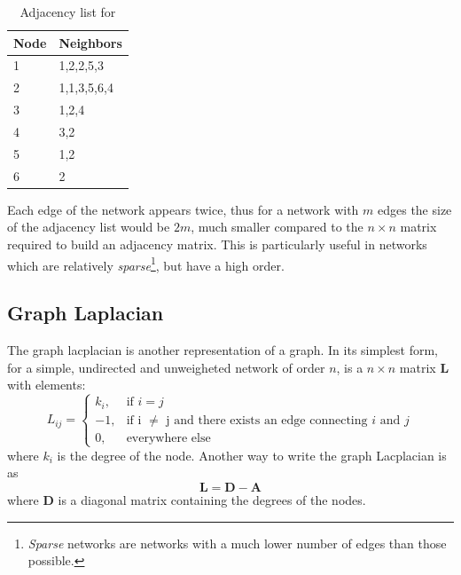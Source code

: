 \begin{table}[H]
  \centering
\begin{tabular}{|l|l|}
\hline
\rowcolor[HTML]{C0C0C0} 
{\color[HTML]{000000} Node} & {\color[HTML]{000000} Neighbors} \\ \hline
1                           & 1,2,2,5,3                        \\ \hline
2                           & 1,1,3,5,6,4                     \\ \hline
3                           & 1,2,4                           \\ \hline
4                           & 3,2                             \\ \hline
5                           & 1,2                             \\ \hline
6                           & 2                                \\ \hline
\end{tabular}
\label{table:adj_list_ex}
\caption{Adjacency list for }
\end{table}
Each edge of the network appears twice, thus for a network with $m$
edges the size of the adjacency list would be $2m$, much smaller
compared to the $n \times n$ matrix required to build an adjacency
matrix. This is particularly useful in networks which are relatively
\textit{sparse}\footnote{\textit{Sparse} networks are networks with a
much lower number of edges than those possible.}, but have a high
order.

\subsection{Graph Laplacian}\label{sec:laplacian}

The graph lacplacian is another representation 
of a graph. In its simplest form, for a simple, undirected and unweigheted
network of order $n$, is a $n \times n$ matrix \textbf{L} with elements:
\begin{equation*}
  L_{ij} = \begin{cases}k_i, &\text{if $i=j$}\\
             -1, & \text{if i $\neq$ j and there exists an edge connecting $i$ and $j$} \\
             0, & \text{everywhere else}
           \end{cases} 
\end{equation*}
where $k_i$ is the degree of the node. Another way to write the graph Lacplacian
is as
\begin{equation*}
  \textbf{L} = \textbf{D} - \textbf{A}
\end{equation*}
where \textbf{D} is a diagonal matrix containing the degrees of the nodes.

